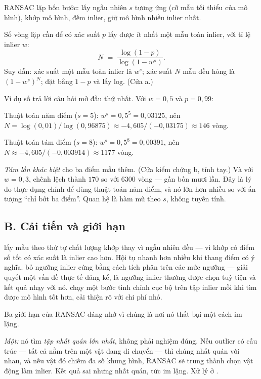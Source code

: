 \documentclass[../../vslam.tex]{subfiles}
\begin{document}
RANSAC \cite{fischler1981ransac} lặp bốn bước: lấy ngẫu nhiên \(s\) tương ứng (cỡ mẫu tối thiểu của mô hình), khớp mô hình, đếm inlier, giữ mô hình nhiều inlier nhất.

Số vòng lặp cần để có xác suất \(p\) lấy được ít nhất một mẫu toàn inlier, với tỉ lệ inlier \(w\):
\begin{equation}
N \;=\; \frac{\log(1-p)}{\log(1 - w^{s})}.
\label{eq:b07-ransac}
\end{equation}
Suy dẫn: xác suất một mẫu toàn inlier là \(w^s\); xác suất \(N\) mẫu đều hỏng là \((1-w^s)^N\); đặt bằng \(1-p\) và lấy log. (Cửa a.)

Ví dụ số trả lời câu hỏi mở đầu thứ nhất. Với \(w = 0{,}5\) và \(p = 0{,}99\):

Thuật toán năm điểm (\(s=5\)): \(w^s = 0{,}5^5 = 0{,}03125\), nên \(N = \log(0{,}01)/\log(0{,}96875) \approx -4{,}605/(-0{,}03175) \approx 146\) vòng.

Thuật toán tám điểm (\(s=8\)): \(w^s = 0{,}5^8 = 0{,}00391\), nên \(N \approx -4{,}605/(-0{,}003914) \approx 1177\) vòng.

\emph{Tám lần khác biệt} cho ba điểm mẫu thêm. (Cửa kiểm chứng b, tính tay.) Và với \(w = 0{,}3\), chênh lệch thành \(170\) so với \(6300\) vòng --- gần bốn mươi lần. Đây là lý do thực dụng chính để dùng thuật toán năm điểm, và nó lớn hơn nhiều so với ấn tượng ``chỉ bớt ba điểm''. Quan hệ là hàm mũ theo \(s\), không tuyến tính.

\subsection{B. Cải tiến và giới hạn}

 \cite{chum2005prosac} lấy mẫu theo thứ tự chất lượng khớp thay vì ngẫu nhiên đều --- vì khớp có điểm số tốt có xác suất là inlier cao hơn. Hội tụ nhanh hơn nhiều khi thang điểm có ý nghĩa.  \cite{barath2020magsac} bỏ ngưỡng inlier cứng bằng cách tích phân trên các mức ngưỡng --- giải quyết một vấn đề thực tế đáng kể, là ngưỡng inlier thường được chọn tuỳ tiện và kết quả nhạy với nó.  chạy một bước tinh chỉnh cục bộ trên tập inlier mỗi khi tìm được mô hình tốt hơn, cải thiện rõ với chi phí nhỏ.

Ba giới hạn của RANSAC đáng nhớ vì chúng là nơi nó thất bại một cách im lặng.

\emph{Một:} nó tìm \emph{tập nhất quán lớn nhất}, không phải nghiệm đúng. Nếu outlier có cấu trúc --- tất cả nằm trên một vật đang di chuyển --- thì chúng nhất quán với nhau, và nếu vật đó chiếm đa số khung hình, RANSAC sẽ trung thành chọn vật động làm inlier. Kết quả sai nhưng nhất quán, tức im lặng. Xử lý ở .
\end{document}
